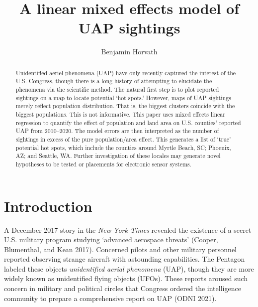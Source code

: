 \documentclass[]{elsarticle} %
\begin{document}
\begin{frontmatter}

  \title{A linear mixed effects model of UAP sightings}
    \author[]{Benjamin Horvath}
  
  
  \begin{abstract}
  Unidentified aeriel phenomena (UAP) have only recently captured the
  interest of the U.S. Congress, though there is a long history of
  attempting to elucidate the phenomena via the scientific method. The
  natural first step is to plot reported sightings on a map to locate
  potential `hot spots.' However, maps of UAP sightings merely reflect
  population distribution. That is, the biggest clusters coincide with
  the biggest populations. This is not informative. This paper uses
  mixed effects linear regression to quantify the effect of population
  and land area on U.S. counties' reported UAP from 2010--2020. The
  model errors are then interpreted as the number of sightings in excess
  of the pure population/area effect. This generates a list of `true'
  potential hot spots, which include the counties around Myrtle Beach,
  SC; Phoenix, AZ; and Seattle, WA. Further investigation of these
  locales may generate novel hypotheses to be tested or placements for
  electronic sensor systems.
  \end{abstract}
  
 \end{frontmatter}

\hypertarget{introduction}{%
\section{Introduction}\label{introduction}}

A December 2017 story in the \emph{New York Times} revealed the
existence of a secret U.S. military program studying `advanced aerospace
threats' (Cooper, Blumenthal, and Kean 2017). Concerned pilots and other
military personnel reported observing strange aircraft with astounding
capabilities. The Pentagon labeled these objects \emph{unidentified
aerial phenomena} (UAP), though they are more widely known as
unidentified flying objects (UFOs). These reports aroused such concern
in military and political circles that Congress ordered the intelligence
community to prepare a comprehensive report on UAP (ODNI 2021).
\end{document}
